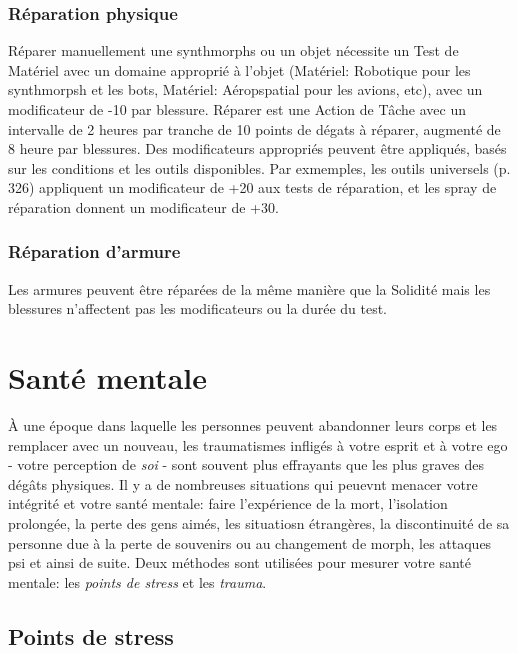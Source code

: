 \subsubsection{Réparation physique} 

Réparer manuellement une synthmorphs ou un objet nécessite un Test de Matériel avec un domaine approprié à l'objet (Matériel: Robotique pour les synthmorpsh et les bots, Matériel: Aéropspatial pour les avions, etc), avec un modificateur de -10 par blessure. Réparer est une Action de Tâche avec un intervalle de 2 heures par tranche de 10 points de dégats à réparer, augmenté de 8 heure par blessures. Des modificateurs appropriés peuvent être appliqués, basés sur les conditions et les outils disponibles. Par exmemples, les outils universels (p. 326) appliquent un modificateur de +20 aux tests de réparation, et les spray de réparation donnent un modificateur de +30. 

\subsubsection{Réparation d'armure} 

Les armures peuvent être réparées de la même manière que la Solidité mais les blessures n'affectent pas les modificateurs ou la durée du test. 

\section{Santé mentale} \label{sec:mental-health} 

À une époque dans laquelle les personnes peuvent abandonner leurs corps et les remplacer avec un nouveau, les traumatismes infligés à votre esprit et à votre ego - votre perception de \emph{soi} - sont souvent plus effrayants que les plus graves des dégâts physiques. Il y a de nombreuses situations qui peuevnt menacer votre intégrité et votre santé mentale: faire l'expérience de la mort, l'isolation prolongée, la perte des gens aimés, les situatiosn étrangères, la discontinuité de sa personne due à la perte de souvenirs ou au changement de morph, les attaques psi et ainsi de suite. Deux méthodes sont utilisées pour mesurer votre santé mentale: les \emph{points de stress} et les \emph{trauma}. 

\subsection{Points de stress} \label{sec:stress-points} 

